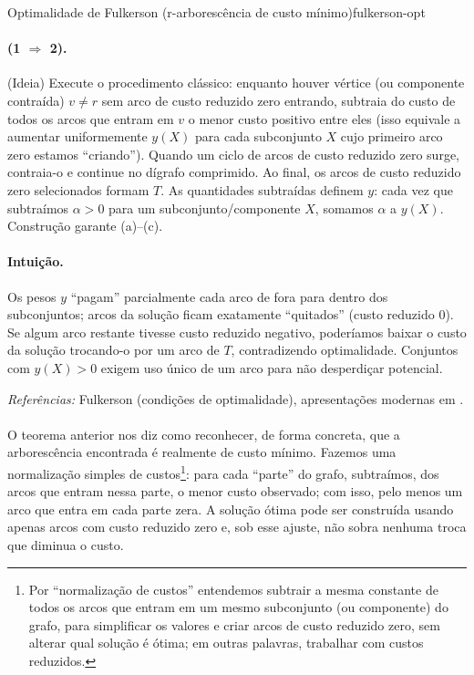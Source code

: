 \documentclass[12pt,a4paper]{article}
\begin{document}
\begin{teobox}{Optimalidade de Fulkerson (r-arborescência de custo mínimo)}{fulkerson-opt}
\paragraph{(1 $\Rightarrow$ 2).} (Ideia) Execute o procedimento clássico: enquanto houver vértice (ou componente contraída) $v\neq r$ sem arco de custo reduzido zero entrando, subtraia do custo de todos os arcos que entram em $v$ o menor custo positivo entre eles (isso equivale a aumentar uniformemente $y(X)$ para cada subconjunto $X$ cujo primeiro arco zero estamos “criando”). Quando um ciclo de arcos de custo reduzido zero surge, contraia-o e continue no dígrafo comprimido. Ao final, os arcos de custo reduzido zero selecionados formam $T$. As quantidades subtraídas definem $y$: cada vez que subtraímos $\alpha>0$ para um subconjunto/componente $X$, somamos $\alpha$ a $y(X)$. Construção garante (a)–(c).

\paragraph{Intuição.} Os pesos $y$ “pagam” parcialmente cada arco de fora para dentro dos subconjuntos; arcos da solução ficam exatamente “quitados” (custo reduzido 0). Se algum arco restante tivesse custo reduzido negativo, poderíamos baixar o custo da solução trocando-o por um arco de $T$, contradizendo optimalidade. Conjuntos com $y(X)>0$ exigem uso único de um arco para não desperdiçar potencial.

\medskip
\emph{Referências:} Fulkerson (condições de optimalidade), apresentações modernas em \cite{frank2014, schrijver2003comb}.
\label{thm:fulkerson-optimalidade-arborescencia}
\end{teobox}

\paragraph{}
O teorema anterior nos diz como reconhecer, de forma concreta, que a arborescência encontrada é realmente de custo mínimo. Fazemos uma normalização simples de custos\footnote{Por “normalização de custos” entendemos subtrair a mesma constante de todos os arcos que entram em um mesmo subconjunto (ou componente) do grafo, para simplificar os valores e criar arcos de custo reduzido zero, sem alterar qual solução é ótima; em outras palavras, trabalhar com custos reduzidos.}: para cada “parte” do grafo, subtraímos, dos arcos que entram nessa parte, o menor custo observado; com isso, pelo menos um arco que entra em cada parte zera. A solução ótima pode ser construída usando apenas arcos com custo reduzido zero e, sob esse ajuste, não sobra nenhuma troca que diminua o custo.
\end{document}
